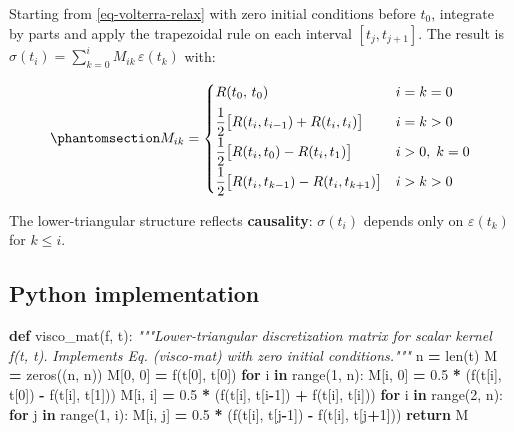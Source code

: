 \documentclass[
  a4paper,
  numbers=noendperiod,
  DIV=12]{scrreprt}
\newenvironment{Shaded}{\begin{snugshade}}{\end{snugshade}}
\newcommand{\BuiltInTok}[1]{#1}
\newcommand{\CommentTok}[1]{\textcolor[rgb]{0.56,0.35,0.01}{\textit{#1}}}
\newcommand{\ControlFlowTok}[1]{\textcolor[rgb]{0.13,0.29,0.53}{\textbf{#1}}}
\newcommand{\DecValTok}[1]{\textcolor[rgb]{0.00,0.00,0.81}{#1}}
\newcommand{\FloatTok}[1]{\textcolor[rgb]{0.00,0.00,0.81}{#1}}
\newcommand{\KeywordTok}[1]{\textcolor[rgb]{0.13,0.29,0.53}{\textbf{#1}}}
\newcommand{\NormalTok}[1]{#1}
\newcommand{\OperatorTok}[1]{\textcolor[rgb]{0.81,0.36,0.00}{\textbf{#1}}}
\begin{document}
Starting from \ref{eq-volterra-relax} with zero initial conditions
before \(t_0\), integrate by parts and apply the trapezoidal rule on
each interval \([t_j, t_{j+1}]\). The result is
\(\sigma(t_i) = \sum_{k=0}^{i} M_{ik}\,\varepsilon(t_k)\) with:

\begin{equation}\protect\phantomsection\label{eq-visco-mat}{
M_{ik} = \begin{cases}
R(t_0,\,t_0) & i=k=0 \\[4pt]
\dfrac{1}{2}\bigl[R(t_i,t_{i-1}) + R(t_i,t_i)\bigr] & i=k>0 \\[4pt]
\dfrac{1}{2}\bigl[R(t_i,t_0) - R(t_i,t_1)\bigr] & i>0,\;k=0 \\[4pt]
\dfrac{1}{2}\bigl[R(t_i,t_{k-1}) - R(t_i,t_{k+1})\bigr] & i>k>0
\end{cases}
}\end{equation}

The lower-triangular structure reflects \textbf{causality}:
\(\sigma(t_i)\) depends only on \(\varepsilon(t_k)\) for \(k \le i\).

\subsection{Python implementation}\label{python-implementation}

\begin{Shaded}
\begin{Highlighting}[]
\KeywordTok{def}\NormalTok{ visco\_mat(f, t):}
    \CommentTok{"""Lower{-}triangular discretization matrix for scalar kernel f(t, t\textquotesingle{}).}
\CommentTok{    Implements Eq. (visco{-}mat) with zero initial conditions."""}
\NormalTok{    n }\OperatorTok{=} \BuiltInTok{len}\NormalTok{(t)}
\NormalTok{    M }\OperatorTok{=}\NormalTok{ zeros((n, n))}
\NormalTok{    M[}\DecValTok{0}\NormalTok{, }\DecValTok{0}\NormalTok{] }\OperatorTok{=}\NormalTok{ f(t[}\DecValTok{0}\NormalTok{], t[}\DecValTok{0}\NormalTok{])}
    \ControlFlowTok{for}\NormalTok{ i }\KeywordTok{in} \BuiltInTok{range}\NormalTok{(}\DecValTok{1}\NormalTok{, n):}
\NormalTok{        M[i, }\DecValTok{0}\NormalTok{] }\OperatorTok{=} \FloatTok{0.5} \OperatorTok{*}\NormalTok{ (f(t[i], t[}\DecValTok{0}\NormalTok{]) }\OperatorTok{{-}}\NormalTok{ f(t[i], t[}\DecValTok{1}\NormalTok{]))}
\NormalTok{        M[i, i] }\OperatorTok{=} \FloatTok{0.5} \OperatorTok{*}\NormalTok{ (f(t[i], t[i}\OperatorTok{{-}}\DecValTok{1}\NormalTok{]) }\OperatorTok{+}\NormalTok{ f(t[i], t[i]))}
    \ControlFlowTok{for}\NormalTok{ i }\KeywordTok{in} \BuiltInTok{range}\NormalTok{(}\DecValTok{2}\NormalTok{, n):}
        \ControlFlowTok{for}\NormalTok{ j }\KeywordTok{in} \BuiltInTok{range}\NormalTok{(}\DecValTok{1}\NormalTok{, i):}
\NormalTok{            M[i, j] }\OperatorTok{=} \FloatTok{0.5} \OperatorTok{*}\NormalTok{ (f(t[i], t[j}\OperatorTok{{-}}\DecValTok{1}\NormalTok{]) }\OperatorTok{{-}}\NormalTok{ f(t[i], t[j}\OperatorTok{+}\DecValTok{1}\NormalTok{]))}
    \ControlFlowTok{return}\NormalTok{ M}
\end{Highlighting}
\end{Shaded}
\end{document}
